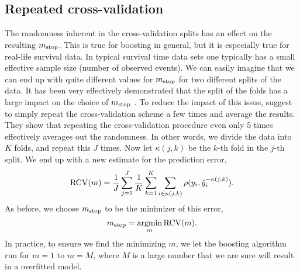 \subsection{Repeated cross-validation}
The randomness inherent in the cross-validation splits has an effect on the resulting $m_{\text{stop}}$.
This is true for boosting in general, but it is especially true for real-life survival data.
In typical survival time data sets one typically has a small effective sample size (number of observed events).
We can easily imagine that we can end up with quite different values for $m_{\text{stop}}$ for two different splits of the data.
It has been very effectively demonstrated that the split of the folds has a large impact on the choice of $m_{\text{stop}}$ \citep{seibold}.
To reduce the impact of this issue, \citet{seibold} suggest to simply repeat the cross-validation scheme a few times and average the results.
They show that repeating the cross-validation procedure even only 5 times effectively averages out the randomness.
In other words, we divide the data into $K$ folds, and repeat this $J$ times.
Now let $\kappa(j, k)$ be the $k$-th fold in the $j$-th split.
We end up with a new estimate for the prediction error,
\begin{equation*}
    \operatorname{RCV}(m)=\frac{1}{J}\sum_{j=1}^J\frac{1}{K}\sum_{k=1}^K\sum_{i\in\kappa(j,k)}\rho(y_i,\hat{y}_i^{-\kappa(j,k)}).
\end{equation*}
As before, we choose $m_{\text{stop}}$ to be the minimizer of this error,
\begin{equation*}
    m_{\text{stop}}=\operatorname*{argmin}_{m}\operatorname{RCV}(m).
\end{equation*}
In practice, to ensure we find the minimizing $m$, we let the boosting algorithm run for $m=1$ to $m=M$, where $M$ is a large number that we are sure will result in a overfitted model.

